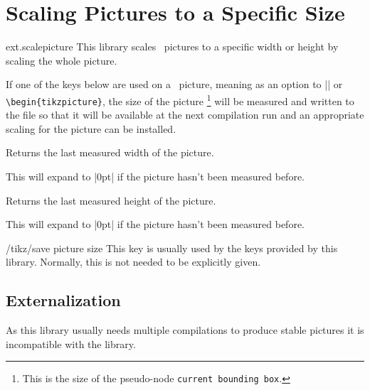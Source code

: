 %
%
%
\clearpage
\section{Scaling Pictures to a Specific Size}
\label{library:scalepicture}

\begin{tikzlibrary}{ext.scalepicture}
  This library scales \tikzname\ pictures to a specific width or height
  by scaling the whole picture.
\end{tikzlibrary}

\begin{multicols}{2}
If one of the keys below are used on a \tikzname\ picture, meaning
as an option to |\tikzpicture| or \texttt{\textbackslash begin\{tikzpicture\}},
the size of the picture%
\footnote{This is the size of the pseudo-node \texttt{current bounding box}.}
will be measured and written to the  file
so that it will be available at the next compilation run
and an appropriate scaling for the picture can be installed.

\begin{command}{\tikzextpicturewidth}
  Returns the last measured width of the picture.
  
  This will expand to |0pt| if the picture hasn't been measured before.
\end{command}
\begin{command}{\tikzextpictureheight}
  Returns the last measured height of the picture.
  
  This will expand to |0pt| if the picture hasn't been measured before.
\end{command}

\begin{stylekey}{/tikz/save picture size}
  This key is usually used by the keys provided by this library.
  Normally, this is not needed to be explicitly given.
\end{stylekey}

\subsection{Externalization}
As this library usually needs multiple compilations
to produce stable pictures it is incompatible
with the  library.


\end{multicols}
